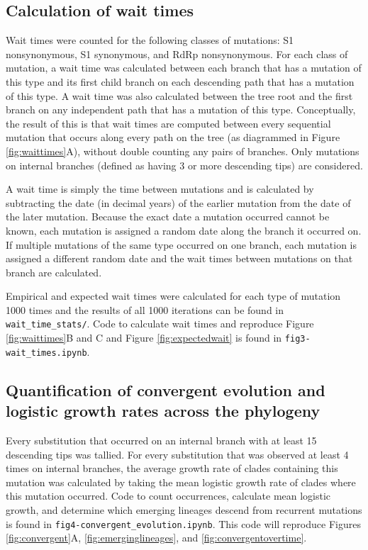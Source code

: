 \documentclass[11pt,oneside,letterpaper]{article}
\begin{document}
\subsection*{Calculation of wait times}
Wait times were counted for the following classes of mutations: S1 nonsynonymous, S1 synonymous, and RdRp nonsynonymous. 
For each class of mutation, a wait time was calculated between each branch that has a mutation of this type and its first child branch on each descending path that has a mutation of this type. 
A wait time was also calculated between the tree root and the first branch on any independent path that has a mutation of this type. 
Conceptually, the result of this is that wait times are computed between every sequential mutation that occurs along every path on the tree (as diagrammed in Figure \ref{fig:waittimes}A), without double counting any pairs of branches. 
Only mutations on internal branches (defined as having 3 or more descending tips) are considered.

A wait time is simply the time between mutations and is calculated by subtracting the date (in decimal years) of the earlier mutation from the date of the later mutation. 
Because the exact date a mutation occurred cannot be known, each mutation is assigned a random date along the branch it occurred on. 
If multiple mutations of the same type occurred on one branch, each mutation is assigned a different random date and the wait times between mutations on that branch are calculated.

Empirical and expected wait times were calculated for each type of mutation 1000 times and the results of all 1000 iterations can be found in \texttt{wait\_time\_stats/}. 
Code to calculate wait times and reproduce Figure \ref{fig:waittimes}B and C and Figure \ref{fig:expectedwait} is found in \texttt{fig3-wait\_times.ipynb}.

\subsection*{Quantification of convergent evolution and logistic growth rates across the phylogeny}
Every substitution that occurred on an internal branch with at least 15 descending tips was tallied. 
For every substitution that was observed at least 4 times on internal branches, the average growth rate of clades containing this mutation was calculated by taking the mean logistic growth rate of clades where this mutation occurred. 
Code to count occurrences, calculate mean logistic growth, and determine which emerging lineages descend from recurrent mutations is found in \texttt{fig4-convergent\_evolution.ipynb}. 
This code will reproduce Figures \ref{fig:convergent}A, \ref{fig:emerginglineages}, and \ref{fig:convergentovertime}.
\end{document}
